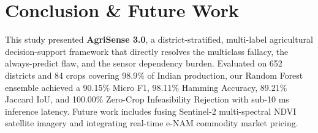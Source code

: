 \documentclass[conference]{IEEEtran}
\begin{document}
\section{Conclusion \& Future Work}
This study presented \textbf{AgriSense 3.0}, a district-stratified, multi-label agricultural decision-support framework that directly resolves the multiclass fallacy, the always-predict flaw, and the sensor dependency burden. Evaluated on 652 districts and 84 crops covering 98.9\% of Indian production, our Random Forest ensemble achieved a 90.15\% Micro F1, 98.11\% Hamming Accuracy, 89.21\% Jaccard IoU, and 100.00\% Zero-Crop Infeasibility Rejection with sub-10 ms inference latency. Future work includes fusing Sentinel-2 multi-spectral NDVI satellite imagery and integrating real-time e-NAM commodity market pricing.



\end{document}
